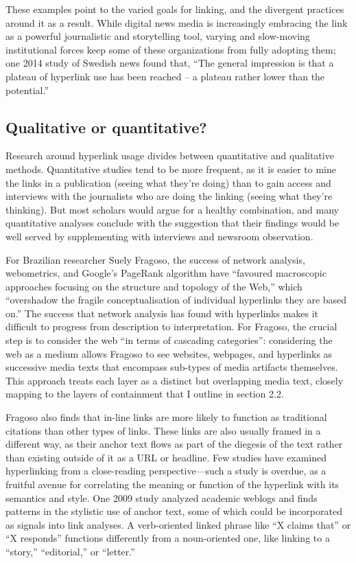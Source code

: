 These examples point to the varied goals for linking, and the divergent practices around it as a result. While digital news media is increasingly embracing the link as a powerful journalistic and storytelling tool, varying and slow-moving institutional forces keep some of these organizations from fully adopting them; one 2014 study of Swedish news found that, ``The general impression is that a plateau of hyperlink use has been reached -- a plateau rather lower than the potential.''\autocite[13]{karlsson_hyperlinking_2014}

\subsection{Qualitative or quantitative?}

Research around hyperlink usage divides between quantitative and qualitative methods. Quantitative studies tend to be more frequent, as it is easier to mine the links in a publication (seeing what they're doing) than to gain access and interviews with the journalists who are doing the linking (seeing what they're thinking). But most scholars would argue for a healthy combination, and many quantitative analyses conclude with the suggestion that their findings would be well served by supplementing with interviews and newsroom observation.

For Brazilian researcher Suely Fragoso, the success of network analysis, webometrics, and Google's PageRank algorithm have ``favoured macroscopic approaches focusing on the structure and topology of the Web,'' which ``overshadow the fragile conceptualisation of individual hyperlinks they are based on.''\autocite[164]{fragoso_understanding_2011} The success that network analysis has found with hyperlinks makes it difficult to progress from description to interpretation. For Fragoso, the crucial step is to consider the web ``in terms of cascading categories'': considering the web as a medium allows Fragoso to see websites, webpages, and hyperlinks as successive media texts that encompass sub-types of media artifacts themselves.\autocite[193]{fragoso_understanding_2011} This approach treats each layer as a distinct but overlapping media text, closely mapping to the layers of containment that I outline in section 2.2.

Fragoso also finds that in-line links are more likely to function as traditional citations than other types of links. These links are also usually framed in a different way, as their anchor text flows as part of the diegesis of the text rather than existing outside of it as a URL or headline. Few studies have examined hyperlinking from a close-reading perspective---such a study is overdue, as a fruitful avenue for correlating the meaning or function of the hyperlink with its semantics and style. One 2009 study analyzed academic weblogs and finds patterns in the stylistic use of anchor text, some of which could be incorporated as signals into link analyses. A verb-oriented linked phrase like ``X claims that'' or ``X responds'' functions differently from a noun-oriented one, like linking to a ``story,'' ``editorial,'' or ``letter.''\autocite[80-85]{luzon_scholarly_2009}

